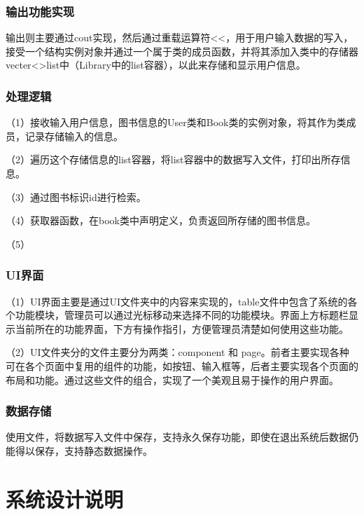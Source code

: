 \documentclass{article}
\begin{document}
\subsubsection{输出功能实现}
输出则主要通过cout实现，然后通过重载运算符<<，用于用户输入数据的写入，接受一个结构实例对象并通过一个属于类的成员函数，并将其添加入类中的存储器vecter<>list中（Library中的list容器），以此来存储和显示用户信息。\\
\subsubsection{处理逻辑}
（1）接收输入用户信息，图书信息的User类和Book类的实例对象，将其作为类成员，记录存储输入的信息。

（2）遍历这个存储信息的list容器，将list容器中的数据写入文件，打印出所存信息。

（3）通过图书标识id进行检索。

（4）获取器函数，在book类中声明定义，负责返回所存储的图书信息。

（5）\\
\subsubsection{UI界面}

（1）UI界面主要是通过UI文件夹中的内容来实现的，table文件中包含了系统的各个功能模块，管理员可以通过光标移动来选择不同的功能模块。界面上方标题栏显示当前所在的功能界面，下方有操作指引，方便管理员清楚如何使用这些功能。

（2）UI文件夹分的文件主要分为两类：component 和 page。前者主要实现各种可在各个页面中复用的组件的功能，如按钮、输入框等，后者主要实现各个页面的布局和功能。通过这些文件的组合，实现了一个美观且易于操作的用户界面。
\subsubsection{数据存储}

使用文件，将数据写入文件中保存，支持永久保存功能，即使在退出系统后数据仍能得以保存，支持静态数据操作。\\
\section{系统设计说明}
\end{document}
